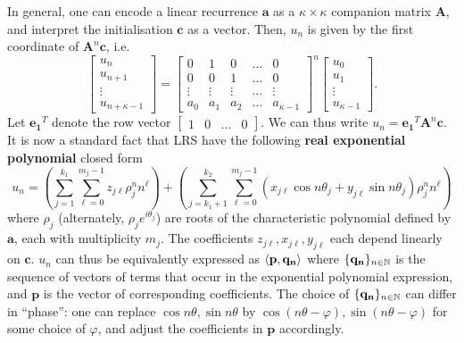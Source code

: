 In general, one can encode a linear recurrence $\mathbf{a}$ as a $\kappa \times \kappa$ companion matrix $\mathbf{A}$, and interpret the initialisation $\mathbf{c}$ as a vector. Then, $u_n$ is given by the first coordinate of $\mathbf{A}^n\mathbf{c}$, i.e.
\begin{equation}
\label{eq:companion}
\begin{bmatrix}
u_n \\
u_{n+1} \\
\vdots \\
u_{n+\kappa-1}
\end{bmatrix} 
= 
\begin{bmatrix}
0 & 1 & 0 & \dots & 0 \\
0 & 0 & 1 & \dots & 0 \\
\vdots & \vdots & \vdots & \dots & \vdots \\
a_0 & a_1 & a_2 & \dots & a_{\kappa-1}
\end{bmatrix}^n
\begin{bmatrix}
u_0 \\
u_{1} \\
\vdots \\
u_{\kappa-1}
\end{bmatrix}.
\end{equation}
Let $\mathbf{e_1}^T$ denote the row vector $\begin{bmatrix}1 & 0 & \dots & 0\end{bmatrix}$. We can thus write $u_n = \mathbf{e_1}^T\mathbf{A}^n\mathbf{c}$. It is now a standard fact that LRS have the following \textbf{real exponential polynomial} closed form 
\begin{equation}
\label{eq:realexppoly}
u_n = \left(\sum_{j=1}^{k_1}\sum_{\ell = 0}^{m_j-1} z_{j\ell}\rho_j^n n^\ell\right) + \left(\sum_{j=k_1 + 1}^{k_2} \sum_{\ell = 0}^{m_j-1} (x_{j\ell} \cos n\theta_j + y_{j\ell}\sin n\theta_j)\rho_j^n n^\ell\right)
\end{equation}
where $\rho_j$ (alternately, $\rho_j e^{i\theta_j}$) are roots of the characteristic polynomial defined by $\mathbf{a}$, each with multiplicity $m_j$. The coefficients $z_{j\ell}, x_{j\ell}, y_{j\ell}$ each depend linearly on $\mathbf{c}$. $u_n$ can thus be equivalently expressed as $\langle\mathbf{p}, \mathbf{q_n}\rangle$ where $\{\mathbf{q_n}\}_{n\in \mathbb{N}}$ is the sequence of vectors of terms that occur in the exponential polynomial expression, and $\mathbf{p}$ is the vector of corresponding coefficients. The choice of $\{\mathbf{q_n}\}_{n\in \mathbb{N}}$ can differ in ``phase'': one can replace $\cos n\theta, \sin n\theta$ by $\cos (n\theta-\varphi), \sin(n\theta-\varphi)$ for some choice of $\varphi$, and adjust the coefficients in $\mathbf{p}$ accordingly.

